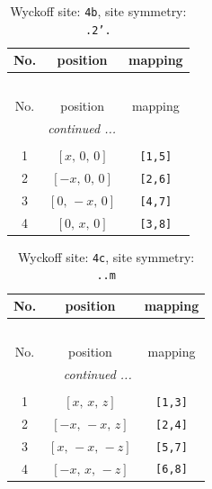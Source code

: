 \documentclass[fleqn,8pt]{jsarticle}
\begin{document}
\begin{longtable}{ccc}
\caption{Wyckoff site: {\tt 4b}, site symmetry: {\tt .2'.}}
 \\
 \hline \hline
No. & position & mapping \\ \hline \endfirsthead

\multicolumn{2}{l}{\tablename\ \thetable{}} \\
 \hline \hline
No. & position & mapping \\ \hline \endhead

 \hline \hline
\multicolumn{2}{r}{\footnotesize\it continued ...} \\ \endfoot

 \hline \hline
\multicolumn{2}{r}{} \\ \endlastfoot

1 & $\left[ x,\, 0,\, 0 \right]$ & {\tt [1,5]} \\ \hline
2 & $\left[ - x,\, 0,\, 0 \right]$ & {\tt [2,6]} \\ \hline
3 & $\left[ 0,\, - x,\, 0 \right]$ & {\tt [4,7]} \\ \hline
4 & $\left[ 0,\, x,\, 0 \right]$ & {\tt [3,8]} \\
\end{longtable}
\renewcommand{\arraystretch}{1.2}
\begin{longtable}{ccc}
\caption{Wyckoff site: {\tt 4c}, site symmetry: {\tt ..m}}
 \\
 \hline \hline
No. & position & mapping \\ \hline \endfirsthead

\multicolumn{2}{l}{\tablename\ \thetable{}} \\
 \hline \hline
No. & position & mapping \\ \hline \endhead

 \hline \hline
\multicolumn{2}{r}{\footnotesize\it continued ...} \\ \endfoot

 \hline \hline
\multicolumn{2}{r}{} \\ \endlastfoot

1 & $\left[ x,\, x,\, z \right]$ & {\tt [1,3]} \\ \hline
2 & $\left[ - x,\, - x,\, z \right]$ & {\tt [2,4]} \\ \hline
3 & $\left[ x,\, - x,\, - z \right]$ & {\tt [5,7]} \\ \hline
4 & $\left[ - x,\, x,\, - z \right]$ & {\tt [6,8]} \\
\end{longtable}
\renewcommand{\arraystretch}{1.2}
\end{document}
